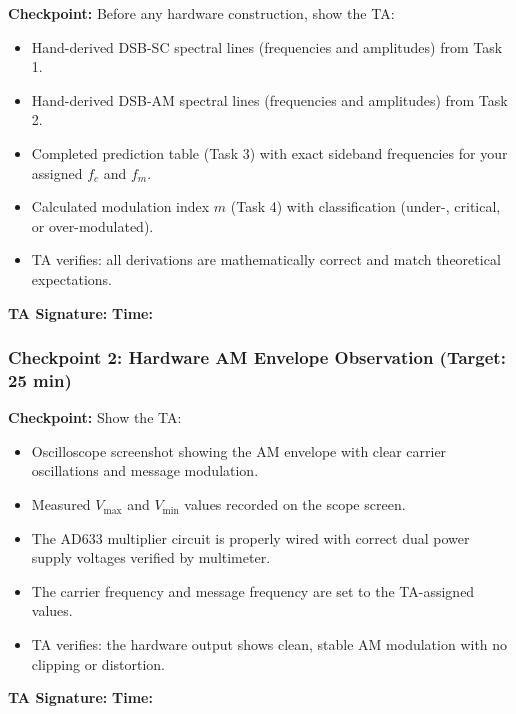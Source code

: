 \documentclass[11pt,letterpaper]{article}
\providecommand{\cpECE}[1]{\textcolor{OliveGreen}{\textbf{Checkpoint:} #1}}
\begin{document}
\cpECE{Before any hardware construction, show the TA:}
\begin{itemize}
    \item[$\square$] Hand-derived DSB-SC spectral lines (frequencies and amplitudes) from Task 1.
    \item[$\square$] Hand-derived DSB-AM spectral lines (frequencies and amplitudes) from Task 2.
    \item[$\square$] Completed prediction table (Task 3) with exact sideband frequencies for your assigned $f_c$ and $f_m$.
    \item[$\square$] Calculated modulation index $m$ (Task 4) with classification (under-, critical, or over-modulated).
    \item[$\square$] TA verifies: all derivations are mathematically correct and match theoretical expectations.
\end{itemize}

\vspace{0.3cm}
\textbf{TA Signature:} \underline{\hspace{2.5cm}} \quad \textbf{Time:} \underline{\hspace{1.5cm}}

\vspace{0.5cm}

\subsubsection*{Checkpoint 2: Hardware AM Envelope Observation (Target: 25 min)}

\cpECE{Show the TA:}
\begin{itemize}
    \item[$\square$] Oscilloscope screenshot showing the AM envelope with clear carrier oscillations and message modulation.
    \item[$\square$] Measured $V_{\max}$ and $V_{\min}$ values recorded on the scope screen.
    \item[$\square$] The AD633 multiplier circuit is properly wired with correct dual power supply voltages verified by multimeter.
    \item[$\square$] The carrier frequency and message frequency are set to the TA-assigned values.
    \item[$\square$] TA verifies: the hardware output shows clean, stable AM modulation with no clipping or distortion.
\end{itemize}

\vspace{0.3cm}
\textbf{TA Signature:} \underline{\hspace{2.5cm}} \quad \textbf{Time:} \underline{\hspace{1.5cm}}
\end{document}
